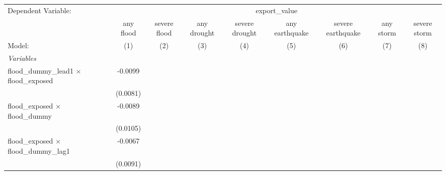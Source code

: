 
\begingroup
\centering
\begin{tabular}{lcccccccc}
   \tabularnewline \midrule \midrule
   Dependent Variable: & \multicolumn{8}{c}{export\_value}\\
                                                                      & any flood             & severe flood          & any drought           & severe drought        & any earthquake        & severe earthquake     & any storm             & severe storm \\   
   Model:                                                             & (1)                   & (2)                   & (3)                   & (4)                   & (5)                   & (6)                   & (7)                   & (8)\\  
   \midrule
   \emph{Variables}\\
   flood\_dummy\_lead1 $\times$ flood\_exposed                        & -0.0099               &                       &                       &                       &                       &                       &                       &   \\   
                                                                      & (0.0081)              &                       &                       &                       &                       &                       &                       &   \\   
   flood\_exposed $\times$ flood\_dummy                               & -0.0089               &                       &                       &                       &                       &                       &                       &   \\   
                                                                      & (0.0105)              &                       &                       &                       &                       &                       &                       &   \\   
   flood\_exposed $\times$ flood\_dummy\_lag1                         & -0.0067               &                       &                       &                       &                       &                       &                       &   \\   
                                                                      & (0.0091)              &                       &                       &                       &                       &                       &                       &   \\   

\end{tabular}

